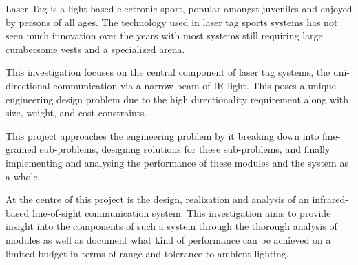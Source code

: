 Laser Tag is a light-based electronic sport, popular amongst juveniles and enjoyed by persons of all ages. The technology used in laser tag sports systems has not seen much innovation over the years with most systems still requiring large cumbersome vests and a specialized arena.

This investigation focuses on the central component of laser tag systems, the uni-directional communication via a narrow beam of IR light. This poses a unique engineering design problem due to the high directionality requirement along with size, weight, and cost constraints.

This project approaches the engineering problem by it breaking down into fine-grained sub-problems, designing solutions for these sub-problems, and finally implementing and analysing the performance of these modules and the system as a whole.

At the centre of this project is the design, realization and analysis of an infrared-based line-of-sight communication system. This investigation aims to provide insight into the components of such a system through the thorough analysis of modules as well as document what kind of performance can be achieved on a limited budget in terms of range and tolerance to ambient lighting.





\iffalse
Your abstract provides a good idea of where the project is going, however, it's missing your key findings and conclusion. An abstract is a highly condensed summary of the entire project and usually follows the following format: intro and problem, project aim, methods, key findings and conclusion.

The abstract is usually the most difficult part to write because of how condensed it needs to be. If you need inspiration, have a look at the abstracts of relevant journal articles :)
\fi
